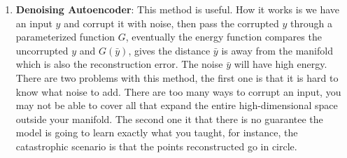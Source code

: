 \begin{enumerate}
    \item \textbf{Denoising Autoencoder}: This method is useful. How it works is we have an input $y$ and corrupt it with noise, then pass the corrupted $y$ through a parameterized function $G$, eventually the energy function compares the uncorrupted $y$ and $G(\bar{y})$, gives the distance $\bar{y}$ is away from the manifold which is also the reconstruction error. The noise $\bar{y}$ will have high energy. There are two problems with this method, the first one is that it is hard to know what noise to add. There are too many ways to corrupt an input, you may not be able to cover all that expand the entire high-dimensional space outside your manifold. The second one it that there is no guarantee the model is going to learn exactly what you taught, for instance, the catastrophic scenario is that the points reconstructed go in circle.
\end{enumerate}
